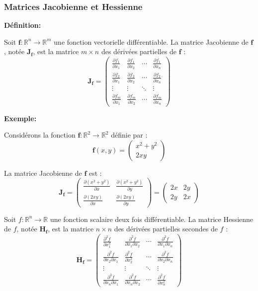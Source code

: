 \subsubsection{Matrices Jacobienne et Hessienne}


\textbf{Définition:}

Soit $\mathbf{f} : \mathbb{R}^n \to \mathbb{R}^m$ une fonction vectorielle différentiable. La matrice Jacobienne de $\mathbf{f}$, notée $\mathbf{J_f}$, est la matrice $m \times n$ des dérivées partielles de $\mathbf{f}$ :
\[
\mathbf{J_f} = \begin{pmatrix}
\frac{\partial f_1}{\partial x_1} & \frac{\partial f_1}{\partial x_2} & \cdots & \frac{\partial f_1}{\partial x_n} \\
\frac{\partial f_2}{\partial x_1} & \frac{\partial f_2}{\partial x_2} & \cdots & \frac{\partial f_2}{\partial x_n} \\
\vdots & \vdots & \ddots & \vdots \\
\frac{\partial f_m}{\partial x_1} & \frac{\partial f_m}{\partial x_2} & \cdots & \frac{\partial f_m}{\partial x_n}
\end{pmatrix}
\]

\textbf{Exemple:}

Considérons la fonction $\mathbf{f} : \mathbb{R}^2 \to \mathbb{R}^2$ définie par :
\[
\mathbf{f}(x, y) = \begin{pmatrix}
x^2 + y^2 \\
2xy
\end{pmatrix}
\]

La matrice Jacobienne de $\mathbf{f}$ est :
\[
\mathbf{J_f} = \begin{pmatrix}
\frac{\partial (x^2 + y^2)}{\partial x} & \frac{\partial (x^2 + y^2)}{\partial y} \\
\frac{\partial (2xy)}{\partial x} & \frac{\partial (2xy)}{\partial y}
\end{pmatrix}
= \begin{pmatrix}
2x & 2y \\
2y & 2x
\end{pmatrix}
\]



Soit $f : \mathbb{R}^n \to \mathbb{R}$ une fonction scalaire deux fois différentiable. La matrice Hessienne de $f$, notée $\mathbf{H_f}$, est la matrice $n \times n$ des dérivées partielles secondes de $f$ :
\[
\mathbf{H_f} = \begin{pmatrix}
\frac{\partial^2 f}{\partial x_1^2} & \frac{\partial^2 f}{\partial x_1 \partial x_2} & \cdots & \frac{\partial^2 f}{\partial x_1 \partial x_n} \\
\frac{\partial^2 f}{\partial x_2 \partial x_1} & \frac{\partial^2 f}{\partial x_2^2} & \cdots & \frac{\partial^2 f}{\partial x_2 \partial x_n} \\
\vdots & \vdots & \ddots & \vdots \\
\frac{\partial^2 f}{\partial x_n \partial x_1} & \frac{\partial^2 f}{\partial x_n \partial x_2} & \cdots & \frac{\partial^2 f}{\partial x_n^2}
\end{pmatrix}
\]

